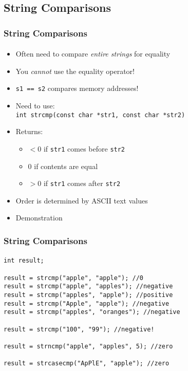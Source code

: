 \documentclass[]{beamer}
\begin{document}
\subsection{String Comparisons}

\begin{frame}[fragile]
  \frametitle{String Comparisons}
  \framesubtitle{}
  
\begin{itemize}[<+->]
  \item Often need to compare \emph{entire strings} for equality
  \item You \emph{cannot} use the equality operator!
  \item \texttt{s1 == s2} compares memory addresses!
  \item Need to use:\\
    \texttt{int strcmp(const char *str1, const char *str2)} 
  \item Returns:
  \begin{itemize}
    \item $< 0$ if \texttt{str1} comes before \texttt{str2}
    \item $0$ if contents are equal
    \item $> 0$ if \texttt{str1} comes after \texttt{str2}
  \end{itemize}
  \item Order is determined by ASCII text values
  \item Demonstration
\end{itemize}
    
\end{frame}

\begin{frame}[fragile]
  \frametitle{String Comparisons}
  \framesubtitle{}

\begin{verbatim}
int result;

result = strcmp("apple", "apple"); //0
result = strcmp("apple", "apples"); //negative
result = strcmp("apples", "apple"); //positive
result = strcmp("Apple", "apple"); //negative
result = strcmp("apples", "oranges"); //negative

result = strcmp("100", "99"); //negative!

result = strncmp("apple", "apples", 5); //zero

result = strcasecmp("ApPlE", "apple"); //zero
\end{verbatim}

\end{frame}
\end{document}
